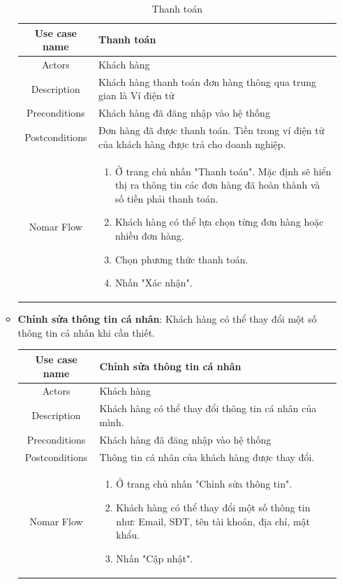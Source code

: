 \begin{itemize}
\begin{itemize}
			\begin{table}[!htp]
				\centering\begin{tabular}{|c|m{25em}|}
					\hline 
					Use case name & Thanh toán\\ 
					\hline 
					Actors & Khách hàng \\ 
					\hline
					Description & Khách hàng thanh toán đơn hàng thông qua trung gian là Ví điện tử \\
					\hline 
					Preconditions & Khách hàng đã đăng nhập vào hệ thống \\
					\hline
					Postconditions & Đơn hàng đã được thanh toán. Tiền trong ví điện tử của khách hàng được trả cho doanh nghiệp. \\
					\hline
					Nomar Flow & \begin{enumerate}
						\item Ở trang chủ nhấn "Thanh toán". Mặc định sẽ hiển thị ra thông tin các đơn hàng đã hoàn thành và số tiền phải thanh toán.
						\item Khách hàng có thể lựa chọn từng đơn hàng hoặc nhiều đơn hàng.
						\item Chọn phương thức thanh toán.
						\item Nhấn "Xác nhận".
						
					\end{enumerate}
					\\
					\hline
				\end{tabular}
				\caption{Thanh toán}
			\end{table}
		
			\item \textbf{Chỉnh sửa thông tin cá nhân}: Khách hàng có thể thay đổi một số thông tin cá nhân khi cần thiết.
			
				\begin{table}[!htp]
					\centering\begin{tabular}{|c|m{25em}|}
						\hline 
						Use case name & Chỉnh sửa thông tin cá nhân\\ 
						\hline 
						Actors & Khách hàng \\ 
						\hline
						Description & Khách hàng có thể thay đổi thông tin cá nhân của mình. \\
						\hline 
						Preconditions & Khách hàng đã đăng nhập vào hệ thống \\
						\hline
						Postconditions & Thông tin cá nhân của khách hàng được thay đổi. \\
						\hline
						Nomar Flow & \begin{enumerate}
							\item Ở trang chủ nhấn "Chỉnh sửa thông tin".
							\item Khách hàng có thể thay đổi một số thông tin như: Email, SĐT, tên tài khoản, địa chỉ, mật khẩu.
							\item Nhấn "Cập nhật".
							

\end{enumerate}
\end{tabular}
\end{table}
\end{itemize}
\end{itemize}
